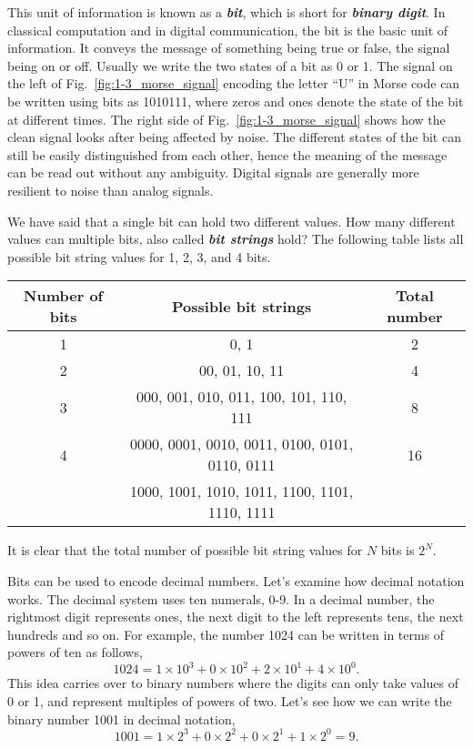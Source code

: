 This unit of information is known as a \textit{\textbf{bit}}, which is short for \textit{\textbf{binary digit}}.
In classical computation and in digital communication, the bit is the basic unit of information.
It conveys the message of something being true or false, the signal being on or off.
Usually we write the two states of a bit as 0 or 1.
The signal on the left of Fig.~\ref{fig:1-3_morse_signal} encoding the letter ``U'' in Morse code can be written using bits as 1010111, where zeros and ones denote the state of the bit at different times.
The right side of Fig.~\ref{fig:1-3_morse_signal} shows how the clean signal looks after being affected by noise.
The different states of the bit can still be easily distinguished from each other, hence the meaning of the message can be read out without any ambiguity.
Digital signals are generally more resilient to noise than analog signals.

We have said that a single bit can hold two different values.
How many different values can multiple bits, also called \textit{\textbf{bit strings}} hold?
The following table lists all possible bit string values for 1, 2, 3, and 4 bits.
\begin{table}[h]
    \centering
    \begin{tabular}{c|c|c}
        Number of bits  & Possible bit strings & Total number \\
        \hline
        1 & 0, 1 & 2 \\
        2 & 00, 01, 10, 11 & 4 \\
        3 & 000, 001, 010, 011, 100, 101, 110, 111 & 8 \\
        4 & 0000, 0001, 0010, 0011, 0100, 0101, 0110, 0111 & 16 \\
        & 1000, 1001, 1010, 1011, 1100, 1101, 1110, 1111 & 
    \end{tabular}
\end{table}
It is clear that the total number of possible bit string values for $N$ bits is $2^N$.

Bits can be used to encode decimal numbers.
Let's examine how decimal notation works.
The decimal system uses ten numerals, 0-9.
In a decimal number, the rightmost digit represents ones, the next digit to the left represents tens, the next hundreds and so on.
For example, the number 1024 can be written in terms of powers of ten as follows,
\begin{equation}
    1024 = 1 \times 10^3 + 0 \times 10^2 + 2 \times 10^1 + 4 \times 10^0.
\end{equation}
This idea carries over to binary numbers where the digits can only take values of 0 or 1, and represent multiples of powers of two.
Let's see how we can write the binary number 1001 in decimal notation,
\begin{equation}
    1001 = 1 \times 2^3 + 0 \times 2^2 + 0 \times 2^1 + 1 \times 2^0 = 9.
\end{equation}

